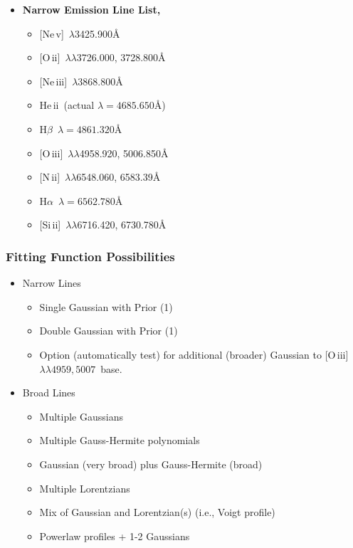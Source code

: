 \documentclass[12pt,letterpaper]{article}
\newcommand{\Halpha}{\ifmmode {\rm H}\alpha \else H$\alpha$\fi}
\newcommand{\Hbeta}{\ifmmode {\rm H}\beta \else H$\beta$\fi}
\newcommand{\heii}{He\,{\sc ii}}
\newcommand{\neiii}{Ne\,{\sc iii}}
\newcommand{\nev}{Ne\,{\sc v}}
\newcommand{\nii}{N\,{\sc ii}}
\newcommand{\oii}{O\,{\sc ii}}
\newcommand{\oiii}{O\,{\sc iii}}
\newcommand{\ob}{[O\,{\sc iii}]\,$\lambda \lambda 4959,5007$}
\newcommand{\Sizw}{Si\,{\sc ii}}
\begin{document}
\begin{itemize}
\item{\bf Narrow Emission Line List, }
  \begin{itemize}
    \itemsep-0.1cm
    \item {[\nev]\, $\lambda$3425.900\AA}
    \item {[\oii]\, $\lambda \lambda$3726.000, 3728.800\AA}
    \item {[\neiii]\, $\lambda$3868.800\AA}
    \item \heii\ (actual $\lambda=4685.650$\AA) 
    \item \Hbeta\ $\lambda=4861.320$\AA
    \item {[\oiii]\, $\lambda \lambda$4958.920, 5006.850\AA}
    \item {[\nii]\, $\lambda \lambda$6548.060, 6583.39\AA}
    \item \Halpha\ $\lambda=6562.780$\AA
    \item {[\Sizw]\, $\lambda \lambda$6716.420, 6730.780\AA}
  \end{itemize}

\end{itemize}

\subsubsection*{Fitting Function Possibilities}

  \begin{itemize}
    \item Narrow Lines
      \begin{itemize}
        \item Single Gaussian with Prior (1) 
	\item Double Gaussian with Prior (1)  
        \item Option (automatically test) for additional (broader) Gaussian to \ob\ base. 
      \end{itemize}
    \item Broad Lines
      \begin{itemize}
        \item Multiple Gaussians
        \item Multiple Gauss-Hermite polynomials
        \item Gaussian (very broad) plus Gauss-Hermite (broad)
        \item Multiple Lorentzians
        \item Mix of Gaussian and Lorentzian(s) (i.e., Voigt profile)
	\item Powerlaw profiles + 1-2 Gaussians 
      \end{itemize}
   \end{itemize}
\end{document}
